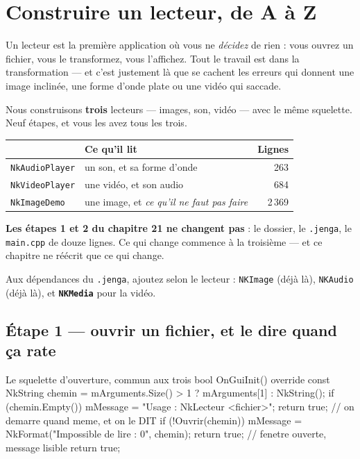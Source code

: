 \chapter{Construire un lecteur, de A à Z}

Un lecteur est la première application où vous ne \emph{décidez} de rien : vous
ouvrez un fichier, vous le transformez, vous l'affichez. Tout le travail est dans
la transformation --- et c'est justement là que se cachent les erreurs qui
donnent une image inclinée, une forme d'onde plate ou une vidéo qui saccade.

Nous construisons \textbf{trois} lecteurs --- images, son, vidéo --- avec le même
squelette. Neuf étapes, et vous les avez tous les trois.

\begin{center}
\begin{tabular}{@{}llr@{}}
\toprule
& \textbf{Ce qu'il lit} & \textbf{Lignes} \\
\midrule
\texttt{NkAudioPlayer} & un son, et sa forme d'onde & 263 \\
\texttt{NkVideoPlayer} & une vidéo, et son audio & 684 \\
\texttt{NkImageDemo} & une image, et \emph{ce qu'il ne faut pas faire} & 2\,369 \\
\bottomrule
\end{tabular}
\end{center}

\begin{nkretenir}
\textbf{Les étapes 1 et 2 du chapitre 21 ne changent pas} : le dossier, le
\texttt{.jenga}, le \texttt{main.cpp} de douze lignes. Ce qui change commence à
la troisième --- et ce chapitre ne réécrit que ce qui change.

Aux dépendances du \texttt{.jenga}, ajoutez selon le lecteur :
\texttt{NKImage} (déjà là), \texttt{NKAudio} (déjà là), et
\textbf{\texttt{NKMedia}} pour la vidéo.
\end{nkretenir}

\section{Étape 1 --- ouvrir un fichier, et le dire quand ça rate}

\begin{nkcode}{Le squelette d'ouverture, commun aux trois}
bool OnGuiInit() override {
    const NkString chemin = mArguments.Size() > 1 ? mArguments[1] : NkString();
    if (chemin.Empty()) {
        mMessage = "Usage : NkLecteur <fichier>";
        return true;                       // on demarre quand meme, et on le DIT
    }
    if (!Ouvrir(chemin)) {
        mMessage = NkFormat("Impossible de lire : {0}", chemin);
        return true;                       // fenetre ouverte, message lisible
    }
    return true;
}
\end{nkcode}

